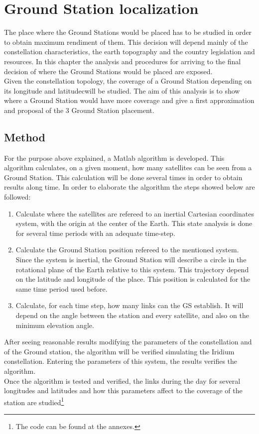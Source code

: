 \section{Ground Station localization}
The place where the Ground Stations would be placed has to be studied in order to obtain maximum rendiment of them. This decision will depend mainly of the constellation characteristics, the earth topography and the country legislation and resources. In this chapter the analysis and procedures for arriving to the final decision of where the Ground Stations would be placed are exposed.\\
Given the constellation topology, the coverage of a Ground Station depending on its longitude and latitudecwill be studied. The aim of this analysis is to show where a Ground Station would have more coverage and give a first approximation and proposal of the 3 Ground Station placement.
\subsection{Method}
For the purpose above explained, a Matlab algorithm is developed. This algorithm calculates, on a given moment, how many satellites can be seen from a Ground Station. This calculation will be done several times in order to obtain results along time. In order to elaborate the algorithm the steps showed below are followed:
\begin{enumerate}
\item Calculate where the satellites are refereed to an inertial Cartesian coordinates system, with the origin at the center of the Earth. This state analysis is done for several time periods with an adequate time-step. 
\item Calculate the Ground Station position refereed to the mentioned system. Since the system is inertial, the Ground Station will describe a circle in the rotational plane of the Earth relative to this system. This trajectory depend on the latitude and longitude of the place. This position is calculated for the same time period used before.
\item Calculate, for each time step, how many links can the GS establish. It will depend on the angle between the station and every satellite, and also on the minimum elevation angle. 
\end{enumerate}
After seeing reasonable results modifying the parameters of the constellation and of the Ground station, the algorithm will be verified simulating the Iridium constellation. Entering the parameters of this system, the results verifies the algorithm.\\
Once the algorithm is tested and verified, the links during the day for several longitudes and latitudes and how this parameters affect to the coverage of the station are studied\footnote{The code can be found at the annexes.}
